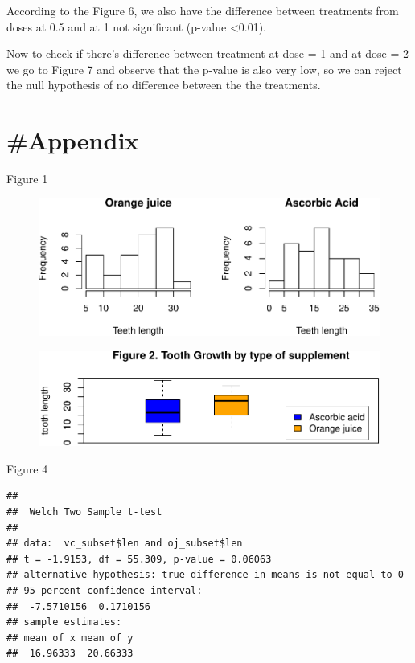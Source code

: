 \documentclass[]{article}
\begin{document}
According to the Figure 6, we also have the difference between
treatments from doses at 0.5 and at 1 not significant (p-value
\textless{}0.01).

Now to check if there's difference between treatment at dose = 1 and at
dose = 2 we go to Figure 7 and observe that the p-value is also very
low, so we can reject the null hypothesis of no difference between the
the treatments.

\newpage

\section{\#Appendix}\label{appendix}

Figure 1

\begin{figure}[htbp]
\centering
\includegraphics{./inference_project_part2_files/figure-latex/unnamed-chunk-3-1.pdf}
\end{figure}

\begin{figure}[htbp]
\centering
\includegraphics{./inference_project_part2_files/figure-latex/unnamed-chunk-4-1.pdf}
\end{figure}

Figure 4

\begin{verbatim}
## 
##  Welch Two Sample t-test
## 
## data:  vc_subset$len and oj_subset$len
## t = -1.9153, df = 55.309, p-value = 0.06063
## alternative hypothesis: true difference in means is not equal to 0
## 95 percent confidence interval:
##  -7.5710156  0.1710156
## sample estimates:
## mean of x mean of y 
##  16.96333  20.66333
\end{verbatim}
\end{document}
